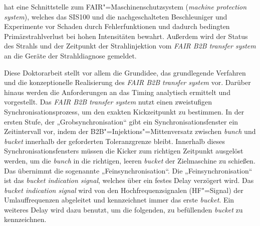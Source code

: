 hat eine Schnittstelle zum FAIR"=Maschinenschutzsystem (\textit{machine protection system}), welches das SIS100 und die nachgeschalteten Beschleuniger und Experimente vor Schaden durch Fehlerfunktionen und dadurch bedingten Prim\"arstrahlverlust bei hohen Intensit\"aten bewahrt. Au\ss{}erdem wird der Status des Strahls und der Zeitpunkt der Strahlinjektion vom \textit{FAIR B2B transfer system} an die Ger\"ate der Strahldiagnose gemeldet.

Diese Doktorarbeit stellt vor allem die Grundidee, das grundlegende Verfahren und die konzeptionelle Realisierung des \textit{FAIR B2B transfer system} vor. Darüber hinaus werden die Anforderungen an das Timing analytisch ermittelt und vorgestellt. Das \textit{FAIR B2B transfer system} nutzt einen zweistufigen Synchronisationsprozess, um den exakten Kickzeitpunkt zu bestimmen. In der ersten Stufe, der „Grobsynchronisation“ gibt ein Synchronisationsfenster ein Zeitintervall vor, indem der B2B"=Injektions"=Mittenversatz zwischen \textit{bunch} und \textit{bucket} innerhalb der geforderten Toleranzgrenze bleibt. Innerhalb dieses Synchronisationsfensters m\"ussen die Kicker zum richtigen Zeitpunkt ausgel\"ost werden, um die \textit{bunch} in die richtigen, leeren \textit{bucket} der Zielmaschine zu schie\ss{}en. Das \"ubernimmt die sogenannte „Feinsynchronisation“.
Die „Feinsynchronisation“ ist das \textit{bucket indication signal}, welches \"uber ein festes Delay verz\"ogert wird. Das \textit{bucket indication signal} wird von den Hochfrequenzsignalen (HF"=Signal) der Umlauffrequenzen abgeleitet und kennzeichnet immer das erste \textit{bucket}. Ein weiteres Delay wird dazu benutzt, um die folgenden, zu bef\"ullenden \textit{bucket} zu kennzeichnen. 

